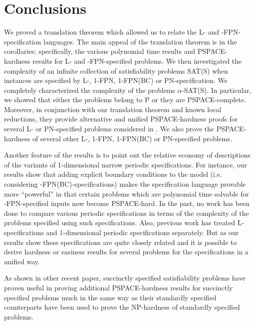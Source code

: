 \section{Conclusions}\label{sec:conclusion}

We proved a translation theorem which allowed us to relate the
{\sf L-} and {-FPN-}specification languages. 
The main appeal of the translation
theorem is in the corollaries; specifically, the various polynomial time
results and {\sf PSPACE}-hardness results for {\sf L}- and 
{-FPN}-specified problems.
We then investigated the complexity of an infinite collection of 
satisfiability problems SAT(S) when instances are specified by 
{\sf L-, 1-FPN, 1-FPN(BC)} or {\sf PN}-specification. 
We completely characterized the
complexity of the problems $\alpha$-{\sf SAT(S)}. In particular, 
we  showed that either the problems belong to
{\sf P} or they are {\sf PSPACE}-complete. 
Moreover, in conjunction with our translation theorem and known local 
reductions, they provide alternative and unified {\sf PSPACE}-hardness proofs for
several {\sf L}- or 
{\sf PN}-specified problems considered in \cite{LW92,Or82a}.
We also prove the {\sf PSPACE}-hardness of several other 
{\sf L-, 1-FPN, 1-FPN(BC)} or {\sf PN}-specified problems.  



Another feature of the results is to point out the relative 
economy of descriptions of
the variants of 1-dimensional narrow periodic specifications. For instance, our
results show that adding explicit boundary conditions to the model (i.e.
considering {-FPN(BC)}-specifications) makes the specification 
language provable
more ``powerful'' in that certain problems which are polynomial time
solvable for {-FPN}-specified inputs now become {\sf PSPACE}-hard. 
In the past,
no work has been done to compare various periodic specifications in terms of
the complexity of the problems specified using such specifications. Also,
previous work has treated {\sf L}-specifications and 1-dimensional periodic 
specifications separately. But as our results show these specifications are
quite closely related and it is possible to derive hardness or easiness results
for several problems for the specifications in a unified way.

\iffalse

As shown in other recent paper, 
succinctly specified satisfiability problems have proven useful in 
proving additional {\sf PSPACE}-hardness results for 
succinctly specified problems much in the same way as their 
standardly specified counterparts have been used to prove the 
{\sf NP}-hardness of  standardly specified problems.


